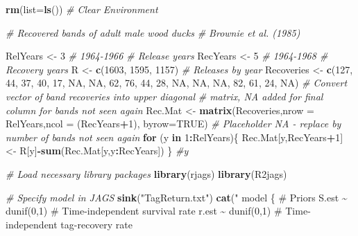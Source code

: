 \documentclass[
]{krantz}
\makeatletter
\newenvironment{Shaded}{\begin{snugshade}}{\end{snugshade}}
\newcommand{\AttributeTok}[1]{\textcolor[rgb]{0.27,0.27,0.27}{#1}}
\newcommand{\CommentTok}[1]{\textcolor[rgb]{0.37,0.37,0.37}{\textit{#1}}}
\newcommand{\ConstantTok}[1]{\textcolor[rgb]{0.37,0.37,0.37}{#1}}
\newcommand{\ControlFlowTok}[1]{\textcolor[rgb]{0.27,0.27,0.27}{\textbf{#1}}}
\newcommand{\DecValTok}[1]{\textcolor[rgb]{0.06,0.06,0.06}{#1}}
\newcommand{\FunctionTok}[1]{\textcolor[rgb]{0.27,0.27,0.27}{\textbf{#1}}}
\newcommand{\NormalTok}[1]{#1}
\newcommand{\OtherTok}[1]{\textcolor[rgb]{0.37,0.37,0.37}{#1}}
\newcommand{\SpecialCharTok}[1]{\textcolor[rgb]{0.43,0.43,0.43}{\textbf{#1}}}
\newcommand{\StringTok}[1]{\textcolor[rgb]{0.5,0.5,0.5}{#1}}
\newenvironment{kframe}{%
\medskip{}
\setlength{\fboxsep}{.8em}
 \def\at@end@of@kframe{}%
 \ifinner\ifhmode%
  \def\at@end@of@kframe{\end{minipage}}%
  \begin{minipage}{\columnwidth}%
 \fi\fi%
 \def\FrameCommand##1{\hskip\@totalleftmargin \hskip-\fboxsep
 \colorbox{shadecolor}{##1}\hskip-\fboxsep
     \hskip-\linewidth \hskip-\@totalleftmargin \hskip\columnwidth}%
 \MakeFramed {\advance\hsize-\width
   \@totalleftmargin\z@ \linewidth\hsize
   \@setminipage}}%
 {\par\unskip\endMakeFramed%
 \at@end@of@kframe}
\renewenvironment{Shaded}{\begin{kframe}}{\end{kframe}}
\makeatother
\begin{document}
\begin{Shaded}
\begin{Highlighting}[]
\FunctionTok{rm}\NormalTok{(}\AttributeTok{list=}\FunctionTok{ls}\NormalTok{()) }\CommentTok{\# Clear Environment}

\CommentTok{\# Recovered bands of adult male wood ducks}
\CommentTok{\# Brownie et al. (1985)}

\NormalTok{RelYears }\OtherTok{\textless{}{-}} \DecValTok{3} \CommentTok{\# 1964{-}1966 \# Release years}
\NormalTok{RecYears }\OtherTok{\textless{}{-}} \DecValTok{5} \CommentTok{\# 1964{-}1968 \# Recovery years}
\NormalTok{R }\OtherTok{\textless{}{-}} \FunctionTok{c}\NormalTok{(}\DecValTok{1603}\NormalTok{, }\DecValTok{1595}\NormalTok{, }\DecValTok{1157}\NormalTok{) }\CommentTok{\# Releases by year}
\NormalTok{Recoveries }\OtherTok{\textless{}{-}} \FunctionTok{c}\NormalTok{(}\DecValTok{127}\NormalTok{, }\DecValTok{44}\NormalTok{, }\DecValTok{37}\NormalTok{, }\DecValTok{40}\NormalTok{, }\DecValTok{17}\NormalTok{, }\ConstantTok{NA}\NormalTok{, }\ConstantTok{NA}\NormalTok{, }\DecValTok{62}\NormalTok{, }\DecValTok{76}\NormalTok{,}
                \DecValTok{44}\NormalTok{, }\DecValTok{28}\NormalTok{, }\ConstantTok{NA}\NormalTok{, }\ConstantTok{NA}\NormalTok{, }\ConstantTok{NA}\NormalTok{, }\DecValTok{82}\NormalTok{, }\DecValTok{61}\NormalTok{, }\DecValTok{24}\NormalTok{, }\ConstantTok{NA}\NormalTok{)}
\CommentTok{\# Convert vector of band recoveries into upper diagonal}
\CommentTok{\# matrix, NA added for final column for bands not seen again}
\NormalTok{Rec.Mat }\OtherTok{\textless{}{-}} \FunctionTok{matrix}\NormalTok{(Recoveries,}\AttributeTok{nrow =}\NormalTok{ RelYears,}\AttributeTok{ncol =}\NormalTok{ (RecYears}\SpecialCharTok{+}\DecValTok{1}\NormalTok{),}
                  \AttributeTok{byrow=}\ConstantTok{TRUE}\NormalTok{)}
\CommentTok{\# Placeholder NA {-} replace by number of bands not seen again}
\ControlFlowTok{for}\NormalTok{ (y }\ControlFlowTok{in} \DecValTok{1}\SpecialCharTok{:}\NormalTok{RelYears)\{}
\NormalTok{  Rec.Mat[y,RecYears}\SpecialCharTok{+}\DecValTok{1}\NormalTok{] }\OtherTok{\textless{}{-}}\NormalTok{ R[y]}\SpecialCharTok{{-}}\FunctionTok{sum}\NormalTok{(Rec.Mat[y,y}\SpecialCharTok{:}\NormalTok{RecYears])}
\NormalTok{\} }\CommentTok{\#y}
                  
\CommentTok{\# Load necessary library packages}
\FunctionTok{library}\NormalTok{(rjags)}
\FunctionTok{library}\NormalTok{(R2jags)}

\CommentTok{\# Specify model in JAGS}
\FunctionTok{sink}\NormalTok{(}\StringTok{"TagReturn.txt"}\NormalTok{)}
\FunctionTok{cat}\NormalTok{(}\StringTok{"}
\StringTok{model \{}
\StringTok{  \# Priors}
\StringTok{  S.est \textasciitilde{} dunif(0,1) \# Time{-}independent survival rate}
\StringTok{  r.est \textasciitilde{} dunif(0,1) \# Time{-}independent tag{-}recovery rate}


\end{Highlighting}
\end{Shaded}
\end{document}
